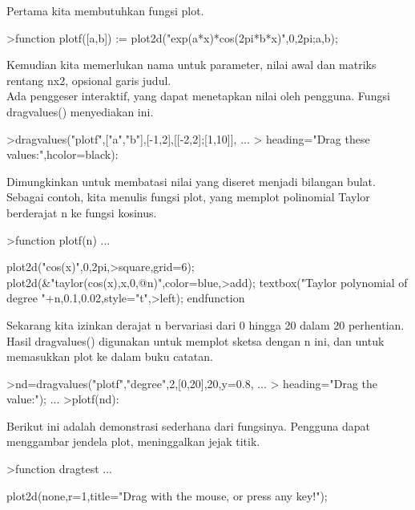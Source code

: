 \documentclass[a4paper,10pt]{article}
\begin{document}
\begin{eulernotebook}
\begin{eulercomment}
\begin{eulercomment}
\begin{eulercomment}
\begin{eulercomment}
\begin{eulercomment}
\begin{eulercomment}
\begin{eulercomment}
\begin{eulercomment}
\begin{eulercomment}
\begin{eulercomment}
\begin{eulercomment}
Pertama kita membutuhkan fungsi plot.
\end{eulercomment}
\begin{eulerprompt}
>function plotf([a,b]) := plot2d("exp(a*x)*cos(2pi*b*x)",0,2pi;a,b);
\end{eulerprompt}
\begin{eulercomment}
Kemudian kita memerlukan nama untuk parameter, nilai awal dan matriks
rentang nx2, opsional garis judul.\\
Ada penggeser interaktif, yang dapat menetapkan nilai oleh pengguna.
Fungsi dragvalues() menyediakan ini.
\end{eulercomment}
\begin{eulerprompt}
>dragvalues("plotf",["a","b"],[-1,2],[[-2,2];[1,10]], ...
>  heading="Drag these values:",hcolor=black):
\end{eulerprompt}
\begin{eulercomment}
Dimungkinkan untuk membatasi nilai yang diseret menjadi bilangan
bulat. Sebagai contoh, kita menulis fungsi plot, yang memplot
polinomial Taylor berderajat n ke fungsi kosinus.
\end{eulercomment}
\begin{eulerprompt}
>function plotf(n) ...
\end{eulerprompt}
\begin{eulerudf}
  plot2d("cos(x)",0,2pi,>square,grid=6);
  plot2d(&"taylor(cos(x),x,0,@n)",color=blue,>add);
  textbox("Taylor polynomial of degree "+n,0.1,0.02,style="t",>left);
  endfunction
\end{eulerudf}
\begin{eulercomment}
Sekarang kita izinkan derajat n bervariasi dari 0 hingga 20 dalam 20
perhentian. Hasil dragvalues() digunakan untuk memplot sketsa dengan n
ini, dan untuk memasukkan plot ke dalam buku catatan.
\end{eulercomment}
\begin{eulerprompt}
>nd=dragvalues("plotf","degree",2,[0,20],20,y=0.8, ...
>   heading="Drag the value:"); ...
>plotf(nd):
\end{eulerprompt}
\begin{eulercomment}
Berikut ini adalah demonstrasi sederhana dari fungsinya. Pengguna
dapat menggambar jendela plot, meninggalkan jejak titik.
\end{eulercomment}
\begin{eulerprompt}
>function dragtest ...
\end{eulerprompt}
\begin{eulerudf}
    plot2d(none,r=1,title="Drag with the mouse, or press any key!");

\end{eulerudf}
\end{eulercomment}
\end{eulercomment}
\end{eulercomment}
\end{eulercomment}
\end{eulercomment}
\end{eulercomment}
\end{eulercomment}
\end{eulercomment}
\end{eulercomment}
\end{eulercomment}
\end{eulernotebook}
\end{document}
